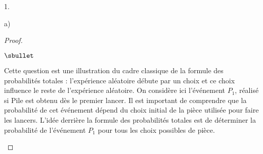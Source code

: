 \documentclass[11pt]{article}%
\begin{document}
\begin{noliste}{1.}
\begin{noliste}{a)}
\begin{proof}
\begin{noliste}{$\sbullet$}
    \end{noliste}
      \begin{remark}
        Cette question est une illustration du cadre classique de la
        formule des probabilités totales : l'expérience aléatoire
        débute par un choix et ce choix influence le reste de
        l'expérience aléatoire. On considère ici l'événement $P_1$,
        réalisé si Pile est obtenu dès le premier lancer. Il est
        important de comprendre que la probabilité de cet événement
        dépend du choix initial de la pièce utilisée pour faire les
        lancers. L'idée derrière la formule des probabilités totales
        est de déterminer la probabilité de l'événement $P_1$ pour tous
        les choix possibles de pièce.\\

\end{remark}
\end{proof}
\end{noliste}
\end{noliste}
\end{document}
